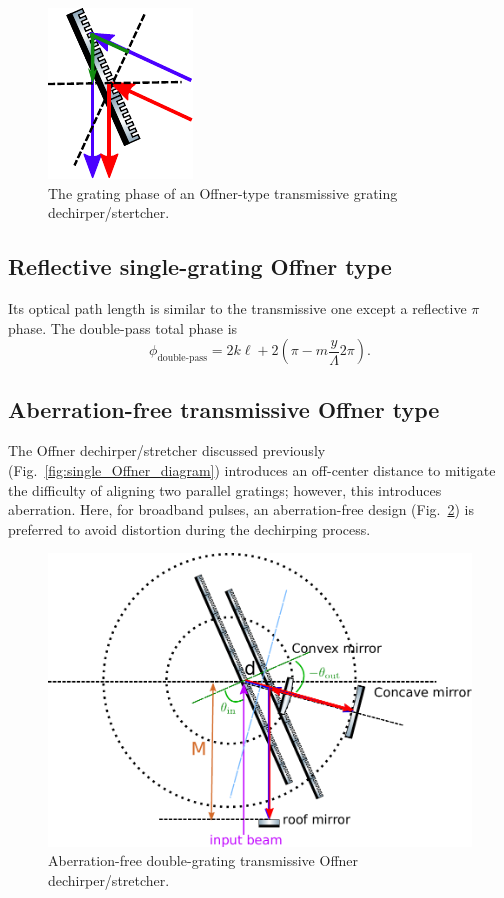 \documentclass[12pt,hidelinks]{book}
\begin{document}
\begin{figure}[htbp]
\centering
\includegraphics[width=0.2\linewidth]{transmissive Offner_grating phase.pdf}
\caption{The grating phase of an Offner-type transmissive grating dechirper/stertcher.}
\label{fig:transmissive_Offner_grating_phase}
\end{figure}

\subsection{Reflective single-grating Offner type}
Its optical path length is similar to the transmissive one except a reflective $\pi$ phase. The double-pass total phase is
\begin{equation}
\phi_{\text{double-pass}}=2k\ell+2\left(\pi-m\frac{y}{\Lambda}2\pi\right).
\end{equation}

\subsection{Aberration-free transmissive Offner type}
The Offner dechirper/stretcher discussed previously (Fig.~\ref{fig:single_Offner_diagram}) introduces an off-center distance to mitigate the difficulty of aligning two parallel gratings; however, this introduces aberration. Here, for broadband pulses, an aberration-free design (Fig.~\ref{fig:aberration-free-Offner}) is preferred to avoid distortion during the dechirping process.

\begin{figure}[htbp]
\centering
\includegraphics[width=\textwidth]{Offner stretcher (aberration-free double gratings).pdf}
\caption{Aberration-free double-grating transmissive Offner dechirper/stretcher.}
\label{fig:aberration-free-Offner}
\end{figure}
\end{document}
